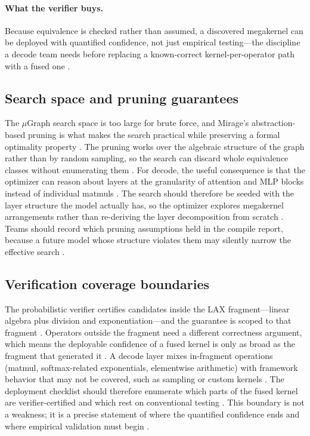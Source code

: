 \paragraph{What the verifier buys.} Because equivalence is checked rather than assumed, a discovered megakernel can be deployed with quantified confidence, not just empirical testing---the discipline a decode team needs before replacing a known-correct kernel-per-operator path with a fused one \citep{wu2024mirage,patel2025llminference}.

\subsection{Search space and pruning guarantees}

The $\mu$Graph search space is too large for brute force, and Mirage's abstraction-based pruning is what makes the search practical while preserving a formal optimality property \citep{wu2024mirage}. The pruning works over the algebraic structure of the graph rather than by random sampling, so the search can discard whole equivalence classes without enumerating them \citep{wu2024mirage,chen2020compilerbasedhardw}. For decode, the useful consequence is that the optimizer can reason about layers at the granularity of attention and MLP blocks instead of individual matmuls \citep{dao2022flashattention,taxbreak2026}. The search should therefore be seeded with the layer structure the model actually has, so the optimizer explores megakernel arrangements rather than re-deriving the layer decomposition from scratch \citep{wu2024mirage,patel2025llminference}. Teams should record which pruning assumptions held in the compile report, because a future model whose structure violates them may silently narrow the effective search \citep{memoryfloor2026,wu2024mirage}.

\subsection{Verification coverage boundaries}

The probabilistic verifier certifies candidates inside the LAX fragment---linear algebra plus division and exponentiation---and the guarantee is scoped to that fragment \citep{wu2024mirage}. Operators outside the fragment need a different correctness argument, which means the deployable confidence of a fused kernel is only as broad as the fragment that generated it \citep{wu2024mirage,patel2025llminference}. A decode layer mixes in-fragment operations (matmul, softmax-related exponentials, elementwise arithmetic) with framework behavior that may not be covered, such as sampling or custom kernels \citep{dao2022flashattention,mpk2025}. The deployment checklist should therefore enumerate which parts of the fused kernel are verifier-certified and which rest on conventional testing \citep{chen2020compilerbasedhardw,memoryfloor2026}. This boundary is not a weakness; it is a precise statement of where the quantified confidence ends and where empirical validation must begin \citep{wu2024mirage,taxbreak2026}.


